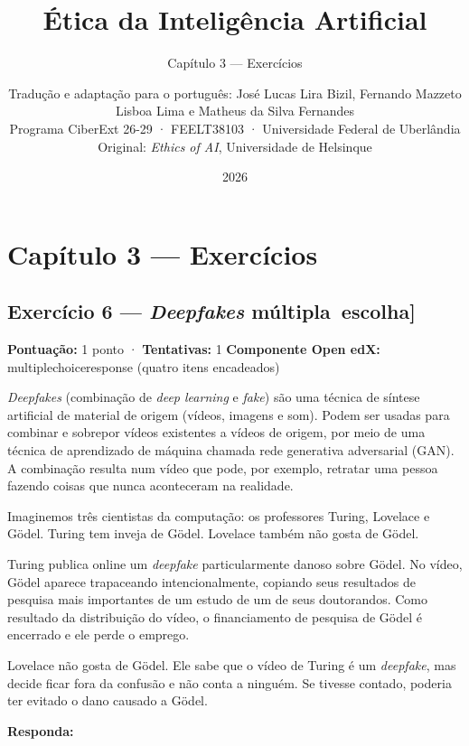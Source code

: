\documentclass[
  11pt,
]{article}
\title{Ética da Inteligência Artificial}
\subtitle{Capítulo 3 --- Exercícios}
\author{Tradução e adaptação para o português: José Lucas Lira Bizil,
Fernando Mazzeto Lisboa Lima e Matheus da Silva Fernandes\\
Programa CiberExt 26-29 · FEELT38103 · Universidade Federal de
Uberlândia\\
Original: \emph{Ethics of AI}, Universidade de Helsinque}
\date{2026}
\renewcommand{\texttt}[1]{{\color{iaAmeixa}\small\ttfamily #1}}
\begin{document}
\maketitle

{
\hypersetup{linkcolor=iaConceitos}
\setcounter{tocdepth}{2}
\tableofcontents
}
\hypertarget{capuxedtulo-3-exercuxedcios}{%
\section{Capítulo 3 --- Exercícios}\label{capuxedtulo-3-exercuxedcios}}

\hypertarget{exercuxedcio-6-deepfakes-muxfaltipla-escolha}{%
\subsection{\texorpdfstring{Exercício 6 --- \emph{Deepfakes}
\texttt{{[}múltipla\ escolha{]}}}{Exercício 6 --- Deepfakes {[}múltipla escolha{]}}}\label{exercuxedcio-6-deepfakes-muxfaltipla-escolha}}

\textbf{Pontuação:} 1 ponto · \textbf{Tentativas:} 1 \textbf{Componente
Open edX:} \texttt{multiplechoiceresponse} (quatro itens encadeados)

\emph{Deepfakes} (combinação de \emph{deep learning} e \emph{fake}) são
uma técnica de síntese artificial de material de origem (vídeos, imagens
e som). Podem ser usadas para combinar e sobrepor vídeos existentes a
vídeos de origem, por meio de uma técnica de aprendizado de máquina
chamada rede generativa adversarial (GAN). A combinação resulta num
vídeo que pode, por exemplo, retratar uma pessoa fazendo coisas que
nunca aconteceram na realidade.

Imaginemos três cientistas da computação: os professores Turing,
Lovelace e Gödel. Turing tem inveja de Gödel. Lovelace também não gosta
de Gödel.

Turing publica online um \emph{deepfake} particularmente danoso sobre
Gödel. No vídeo, Gödel aparece trapaceando intencionalmente, copiando
seus resultados de pesquisa mais importantes de um estudo de um de seus
doutorandos. Como resultado da distribuição do vídeo, o financiamento de
pesquisa de Gödel é encerrado e ele perde o emprego.

Lovelace não gosta de Gödel. Ele sabe que o vídeo de Turing é um
\emph{deepfake}, mas decide ficar fora da confusão e não conta a
ninguém. Se tivesse contado, poderia ter evitado o dano causado a Gödel.

\textbf{Responda:}
\end{document}
